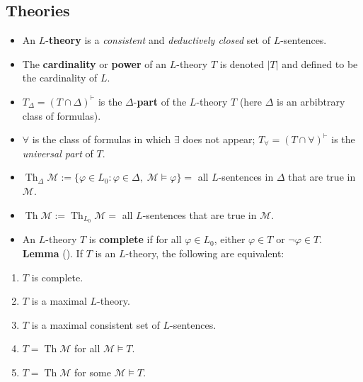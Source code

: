 \documentclass[a4paper,UKenglish,cleveref,autoref,thm-restate,12pt]{lipics-v2021-wjd}
\newcommand{\<}{\langle}
\renewcommand{\>}{\rangle}
\newcommand\bfall{\boldsymbol{\forall}}
\begin{document}

\subsection{Theories}\label{theories}

\begin{itemize}
\item
  An \(L\)-\textbf{theory} is a \emph{consistent} and \emph{deductively
  closed} set of \(L\)-sentences.
\item
  The \textbf{cardinality} or \textbf{power} of an \(L\)-theory \(T\) is
  denoted \(|T|\) and defined to be the cardinality of \(L\).
\item
  \(T_\Delta = (T \cap \Delta)^\vdash\) is the \(\Delta\)-\textbf{part}
  of the \(L\)-theory \(T\) (here \(\Delta\) is an arbibtrary class of
  formulas).
\item
  \(\bfall\) is the class of formulas in which \(\exists\) does not
  appear; \(T_{\bfall} = (T \cap \bfall)^\vdash\) is the \emph{universal
  part} of \(T\).
\item
  \(\operatorname{Th}_\Delta \mathcal M := \{\varphi \in L_0 : \varphi \in \Delta,\; \mathcal M \vDash \varphi\}=\)
  all \(L\)-sentences in \(\Delta\) that are true in \(\mathcal M\).
\item
  \(\operatorname{Th} \mathcal M := \operatorname{Th}_{L_0} \mathcal M =\)
  all \(L\)-sentences that are true in \(\mathcal M\).
\item
  An \(L\)-theory \(T\) is \textbf{complete} if for all
  \(\varphi\in L_0\), either \(\varphi \in T\) or
  \(\neg\varphi\in T\).\\
  \textbf{Lemma} (\cite[3.5.1]{Rothmaler:2000}). If \(T\) is an \(L\)-theory, the following are
  equivalent:
\end{itemize}

\begin{enumerate}
\def\labelenumi{\arabic{enumi}.}
\item
  \(T\) is complete.
\item
  \(T\) is a maximal \(L\)-theory.
\item
  \(T\) is a maximal consistent set of \(L\)-sentences.
\item
  \(T= \operatorname{Th}\mathcal M\) for all \(\mathcal M \vDash T\).
\item
  \(T= \operatorname{Th}\mathcal M\) for some \(\mathcal M \vDash T\).
\end{enumerate}
\end{document}
